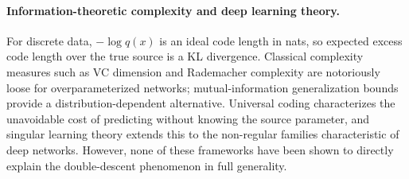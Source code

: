 \paragraph{Information-theoretic complexity and deep learning theory.}
For discrete data, $-\log q(x)$ is an ideal code length in nats, so expected
excess code length over the true source is a KL divergence.
Classical complexity measures such as VC dimension \citep{vapnik1971uniform}
and Rademacher complexity \citep{bartlett2002rademacher} are notoriously
loose for overparameterized networks; mutual-information generalization
bounds \citep{xu2017information,steinke2020reasoning} provide a
distribution-dependent alternative. Universal coding
\citep{rissanen1984universal,barron1998minimum,davisson1973universal,shtarkov1987universal,haussler1997mutual,merhav1998universal,rissanen1996fisher}
characterizes the unavoidable cost of predicting without knowing the
source parameter, and singular learning theory
\citep{watanabe2009algebraic,hoogland2024towards,chen2023dynamical}
extends this to the non-regular families characteristic of deep networks.
However, none of these frameworks have been shown to directly explain the
double-descent phenomenon in full generality.
